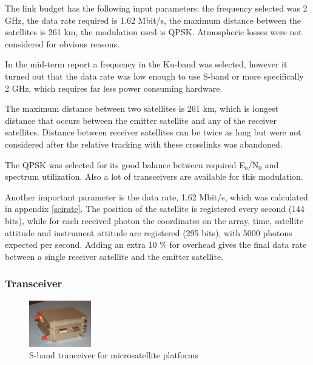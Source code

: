 The link budget has the following input parameters: the frequency selected was 2 GHz, the data rate required is 1.62 Mbit/s, the maximum distance between the satellites is 261 km, the modulation used is QPSK. Atmospheric losses were not considered for obvious reasons.

In the mid-term report a frequency in the Ku-band was selected, however it turned out that the data rate was low enough to use S-band or more specifically 2 GHz, which requires far less power consuming hardware.

The maximum distance between two satellites is 261 km, which is longest distance that occurs between the emitter satellite and any of the receiver satellites. Distance between receiver satellites can be twice as long but were not considered after the relative tracking with these crosslinks was abandoned.

The QPSK was selected for its good balance between required E$_{b}$/N$_{0}$ and spectrum utilization. Also a lot of transceivers are available for this modulation.

Another important parameter is the data rate, 1.62 Mbit/s, which was calculated in appendix \ref{scirate}. The position of the satellite is registered every second (144 bits), while for each received photon the coordinates on the array, time, satellite attitude and instrument attitude are registered (295 bits), with 5000 photons expected per second. Adding an extra 10 \% for overhead gives the final data rate between a single receiver satellite and the emitter satellite.


\subsubsection{Transceiver}
\begin{figure}
\vspace{-60pt}
  \begin{center}
    \includegraphics[width=0.24\textwidth]{chapters/img/Strans.png}
  \end{center}
  \vspace{-15pt}
  \caption{S-band tranceiver for microsatellite platforms}
  \vspace{-20pt}
  \label{Strans}
\end{figure}

